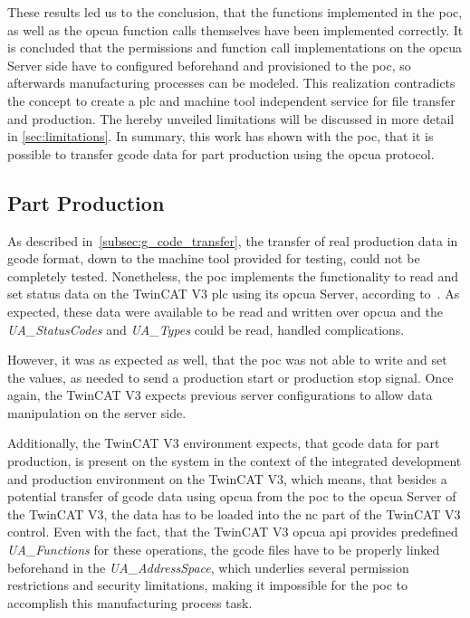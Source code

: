 \documentclass[
a4paper,
twoside,
headsepline,
cleardoublepage=empty,
parskip=half,
draft=false
]{scrbook}
\begin{document}
				These results led us to the conclusion, that the functions implemented in the \gls{poc}, as well as the \gls{opcua} function calls themselves have been implemented correctly. It is concluded that the permissions and function call implementations on the \gls{opcua} Server side have to configured beforehand and provisioned to the \gls{poc}, so afterwards manufacturing processes can be modeled. This realization contradicts the concept to create a \gls{plc} and machine tool independent service for file transfer and production. The hereby unveiled limitations will be discussed in more detail in \cref{sec:limitations}. 
				In summary, this work has shown with the \gls{poc}, that it is possible to transfer \gls{gcode} data for part production using the \gls{opcua} protocol.

			\subsection{Part Production}\label{subsec:part_production}

				As described in~\cref{subsec:g_code_transfer}, the transfer of real production data in \gls{gcode} format, down to the machine tool provided for testing, could not be completely tested. 
				Nonetheless, the \gls{poc} implements the functionality to read and set status data on the TwinCAT V3 \gls{plc} using its \gls{opcua} Server, according to~\cite{twincat2018}.
				As expected, these data were available to be read and written over \gls{opcua} and the \textit{UA\_StatusCodes} and \textit{UA\_Types} could be read, handled complications.
				
				However, it was as expected as well, that the \gls{poc} was not able to write and set the values, as needed to send a production start or production stop signal. 
				Once again, the TwinCAT V3 expects previous server configurations to allow data manipulation on the server side. 
				
				Additionally, the TwinCAT V3 environment expects, that \gls{gcode} data for part production, is present on the system in the context of the integrated development and production environment on the TwinCAT V3, which means, that besides a potential transfer of \gls{gcode} data using \gls{opcua} from the \gls{poc} to the \gls{opcua} Server of the TwinCAT V3, the data has to be loaded into 	the \gls{nc} part of the TwinCAT V3 control. 
				Even with the fact, that the TwinCAT V3 \gls{opcua} \gls{api} provides predefined \textit{UA\_Functions} for these operations, the \gls{gcode} files have to be properly linked beforehand in the \textit{UA\_AddressSpace}, which underlies several permission restrictions and security limitations, making it impossible for the \gls{poc} to accomplish this manufacturing process task.
\end{document}

